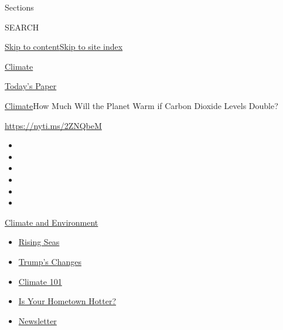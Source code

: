 Sections

SEARCH

\protect\hyperlink{site-content}{Skip to
content}\protect\hyperlink{site-index}{Skip to site index}

\href{https://www.nytimes3xbfgragh.onion/section/climate}{Climate}

\href{https://myaccount.nytimes3xbfgragh.onion/auth/login?response_type=cookie\&client_id=vi}{}

\href{https://www.nytimes3xbfgragh.onion/section/todayspaper}{Today's
Paper}

\href{/section/climate}{Climate}\textbar{}How Much Will the Planet Warm
if Carbon Dioxide Levels Double?

\url{https://nyti.ms/2ZNQbeM}

\begin{itemize}
\item
\item
\item
\item
\item
\item
\end{itemize}

\href{https://www.nytimes3xbfgragh.onion/section/climate?action=click\&pgtype=Article\&state=default\&region=TOP_BANNER\&context=storylines_menu}{Climate
and Environment}

\begin{itemize}
\tightlist
\item
  \href{https://www.nytimes3xbfgragh.onion/2020/07/30/climate/sea-level-inland-floods.html?action=click\&pgtype=Article\&state=default\&region=TOP_BANNER\&context=storylines_menu}{Rising
  Seas}
\item
  \href{https://www.nytimes3xbfgragh.onion/interactive/2020/climate/trump-environment-rollbacks.html?action=click\&pgtype=Article\&state=default\&region=TOP_BANNER\&context=storylines_menu}{Trump's
  Changes}
\item
  \href{https://www.nytimes3xbfgragh.onion/interactive/2020/04/19/climate/climate-crash-course-1.html?action=click\&pgtype=Article\&state=default\&region=TOP_BANNER\&context=storylines_menu}{Climate
  101}
\item
  \href{https://www.nytimes3xbfgragh.onion/interactive/2018/08/30/climate/how-much-hotter-is-your-hometown.html?action=click\&pgtype=Article\&state=default\&region=TOP_BANNER\&context=storylines_menu}{Is
  Your Hometown Hotter?}
\item
  \href{https://www.nytimes3xbfgragh.onion/newsletters/climate-change?action=click\&pgtype=Article\&state=default\&region=TOP_BANNER\&context=storylines_menu}{Newsletter}
\end{itemize}

